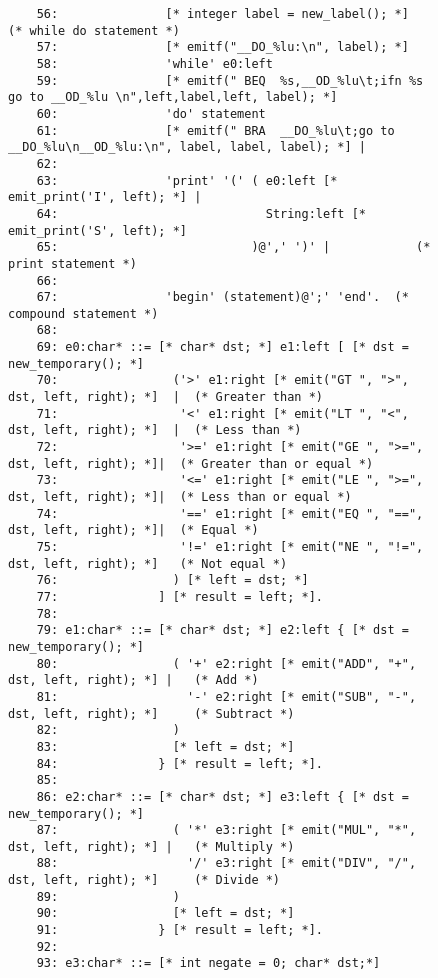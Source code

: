 \begin{figure}
\hspace*{-2.5cm}
\footnotesize
\begin{minipage}{30cm}
\begin{verbatim}
    56:               [* integer label = new_label(); *]        (* while do statement *)
    57:               [* emitf("__DO_%lu:\n", label); *]
    58:               'while' e0:left
    59:               [* emitf(" BEQ  %s,__OD_%lu\t;ifn %s go to __OD_%lu \n",left,label,left, label); *]
    60:               'do' statement
    61:               [* emitf(" BRA  __DO_%lu\t;go to __DO_%lu\n__OD_%lu:\n", label, label, label); *] |
    62: 
    63:               'print' '(' ( e0:left [* emit_print('I', left); *] |
    64:                             String:left [* emit_print('S', left); *]
    65:                           )@',' ')' |            (* print statement *)
    66: 
    67:               'begin' (statement)@';' 'end'.  (* compound statement *)
    68: 
    69: e0:char* ::= [* char* dst; *] e1:left [ [* dst = new_temporary(); *]
    70:                ('>' e1:right [* emit("GT ", ">", dst, left, right); *]  |  (* Greater than *)
    71:                 '<' e1:right [* emit("LT ", "<", dst, left, right); *]  |  (* Less than *)
    72:                 '>=' e1:right [* emit("GE ", ">=", dst, left, right); *]|  (* Greater than or equal *)
    73:                 '<=' e1:right [* emit("LE ", ">=", dst, left, right); *]|  (* Less than or equal *)
    74:                 '==' e1:right [* emit("EQ ", "==", dst, left, right); *]|  (* Equal *)
    75:                 '!=' e1:right [* emit("NE ", "!=", dst, left, right); *]   (* Not equal *)
    76:                ) [* left = dst; *]
    77:              ] [* result = left; *].
    78: 
    79: e1:char* ::= [* char* dst; *] e2:left { [* dst = new_temporary(); *]
    80:                ( '+' e2:right [* emit("ADD", "+", dst, left, right); *] |   (* Add *)
    81:                  '-' e2:right [* emit("SUB", "-", dst, left, right); *]     (* Subtract *)
    82:                )
    83:                [* left = dst; *]
    84:              } [* result = left; *].
    85: 
    86: e2:char* ::= [* char* dst; *] e3:left { [* dst = new_temporary(); *]
    87:                ( '*' e3:right [* emit("MUL", "*", dst, left, right); *] |   (* Multiply *)
    88:                  '/' e3:right [* emit("DIV", "/", dst, left, right); *]     (* Divide *)
    89:                )
    90:                [* left = dst; *]
    91:              } [* result = left; *].
    92: 
    93: e3:char* ::= [* int negate = 0; char* dst;*]

\end{verbatim}
\end{minipage}
\end{figure}
